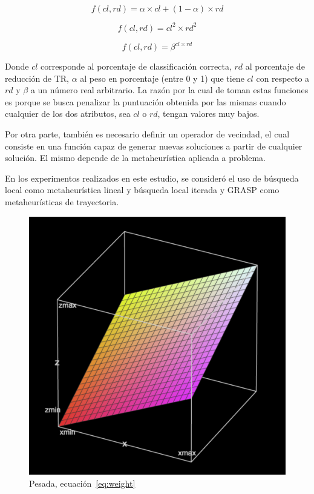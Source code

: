 \documentclass{ci5652}
\begin{document}
\begin{equation}\label{eq:weight}
f(cl,rd) = \alpha\times cl + (1 - \alpha)\times rd
\end{equation}

\begin{equation}\label{eq:sqr}
f(cl,rd) = cl^{2}\times rd^{2}
\end{equation}

\begin{equation}\label{eq:exp}
f(cl,rd) = \beta^{cl\times rd}
\end{equation}

Donde $cl$ corresponde al porcentaje de classificación correcta, $rd$ al porcentaje de reducción de TR, $\alpha$ al peso en porcentaje (entre 0 y 1) que tiene $cl$ con respecto a $rd$ y $\beta$ a un número real arbitrario. La razón por la cual de toman estas funciones es porque se busca penalizar la puntuación obtenida por las mismas cuando cualquier de los dos atributos, sea $cl$ o $rd$, tengan valores muy bajos.

Por otra parte, también es necesario definir un operador de vecindad, el cual consiste en una función capaz de generar nuevas soluciones a partir de cualquier solución. El mismo depende de la metaheurística aplicada a problema.

En los experimentos realizados en este estudio, se consideró el uso de búsqueda local como metaheurística lineal y búsqueda local iterada y GRASP como metaheurísticas de trayectoria.

\begin{figure}[p]
    \centering
    \includegraphics[width=0.8\linewidth]{weighted-3b}
    \caption{Pesada, ecuación~\ref{eq:weight}}
    \label{fig:weighted3}
\end{figure}
\end{document}
